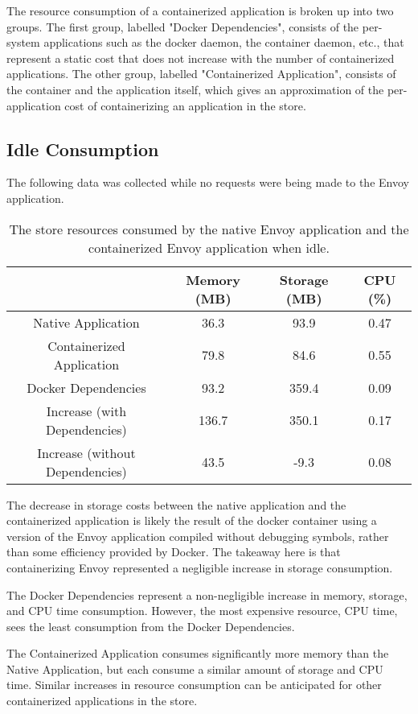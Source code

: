 \documentclass{article}
\begin{document}
The resource consumption of a containerized application is broken up into two groups. The first group, labelled "Docker Dependencies", consists of the per-system applications such as the docker daemon, the container daemon, etc., that represent a static cost that does not increase with the number of containerized applications. The other group, labelled "Containerized Application", consists of the container and the application itself, which gives an approximation of the per-application cost of containerizing an application in the store.

\subsection{Idle Consumption}
The following data was collected while no requests were being made to the Envoy application.

\begin{table}[H]
\begin{tabular}{ |c|c|c|c| }
 \hline
   & Memory (MB) & Storage (MB) & CPU (\%) \\ 
 \hline
 Native Application & 36.3 & 93.9 & 0.47 \\
 \hline
 Containerized Application & 79.8 & 84.6 & 0.55 \\
 \hline
 Docker Dependencies & 93.2 & 359.4 & 0.09 \\
 \hline\hline
 Increase (with Dependencies) & 136.7 & 350.1 & 0.17 \\
 \hline
 Increase (without Dependencies) & 43.5 & -9.3 & 0.08 \\
 \hline
\end{tabular}
\caption{The store resources consumed by the native Envoy application and the containerized Envoy application when idle.}
\label{idle-consumption}
\end{table}

The decrease in storage costs between the native application and the containerized application is likely the result of the docker container using a version of the Envoy application compiled without debugging symbols, rather than some efficiency provided by Docker. The takeaway here is that containerizing Envoy represented a negligible increase in storage consumption.

The Docker Dependencies represent a non-negligible increase in memory, storage, and CPU time consumption. However, the most expensive resource, CPU time, sees the least consumption from the Docker Dependencies.

The Containerized Application consumes significantly more memory than the Native Application, but each consume a similar amount of storage and CPU time. Similar increases in resource consumption can be anticipated for other containerized applications in the store.
\end{document}
